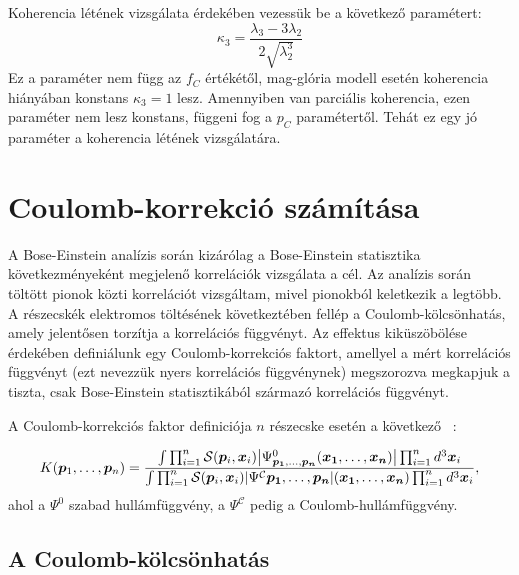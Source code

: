 \documentclass[11pt,a4paper]{article}
\numberwithin{equation}{subsection}
\numberwithin{figure}{section}
\begin{document}
Koherencia létének vizsgálata érdekében vezessük be a következő paramétert:
\begin{equation}
\kappa_3 = \frac{\lambda_3-3\lambda_2}{2\sqrt{\lambda_2^3}}
\end{equation}
Ez a paraméter nem függ az $f_C$ értékétől, mag-glória modell esetén koherencia hiányában konstans $\kappa_3=1$ lesz. Amennyiben van parciális koherencia, ezen paraméter nem lesz konstans, függeni fog a $p_C$ paramétertől. Tehát ez egy jó paraméter a koherencia létének vizsgálatára.


\section{Coulomb-korrekció számítása}
A Bose-Einstein analízis során kizárólag a Bose-Einstein statisztika következményeként megjelenő korrelációk vizsgálata a cél. Az analízis során töltött pionok közti korrelációt vizsgáltam, mivel pionokból keletkezik a legtöbb. A részecskék elektromos töltésének következtében fellép a Coulomb-kölcsönhatás, amely jelentősen torzítja a korrelációs függvényt. Az effektus kiküszöbölése érdekében definiálunk egy Coulomb-korrekciós faktort, amellyel a mért korrelációs függvényt (ezt nevezzük nyers korrelációs függvénynek) megszorozva megkapjuk a tiszta, csak Bose-Einstein statisztikából származó korrelációs függvényt.

A Coulomb-korrekciós faktor definiciója $n$ részecske esetén a következő ~\cite{Alt:2001dj}:

\begin{equation}
K(\bm{p}_1,\dots,\bm{p}_n)=
\frac{
\int \prod_{i=1}^n\mathcal{S}(\bm{p}_i, \bm{x}_i)
\abs{\Psi^{0}_{\bm{p_1},\dots,\bm{p_n}}(\bm{x_1},\dots,\bm{x_n})}\prod_{i=1}^n d^3 \bm{x}_i
}{\int \prod_{i=1}^n\mathcal{S}(\bm{p}_i, \bm{x}_i)
\abs{\Psi^\mathcal{C}\bm{p_1},\dots,\bm{p_n}}(\bm{x_1},\dots,\bm{x_n})\prod_{i=1}^n d^3 \bm{x}_i},
\label{eq:Kn}
\end{equation}
ahol a $\Psi^0$ szabad hullámfüggvény, a $\Psi^\mathcal{C}$ pedig a Coulomb-hullámfüggvény.

\subsection{A Coulomb-kölcsönhatás}
\end{document}
